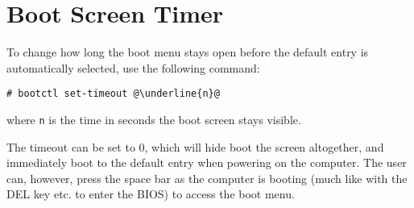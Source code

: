 \documentclass[a4paper]{article}
\begin{document}
\section{Boot Screen Timer}

To change how long the boot menu stays open before the default entry is automatically selected, use the following command:
\begin{lstlisting}[escapechar=@]
# bootctl set-timeout @\underline{n}@
\end{lstlisting}
where \lstinline|n| is the time in seconds the boot screen stays visible.

The timeout can be set to 0, which will hide boot the screen altogether, and immediately boot to the default entry when powering on the computer.
The user can, however, press the space bar as the computer is booting (much like with the DEL key etc. to enter the BIOS) to access the boot menu.






\end{document}
